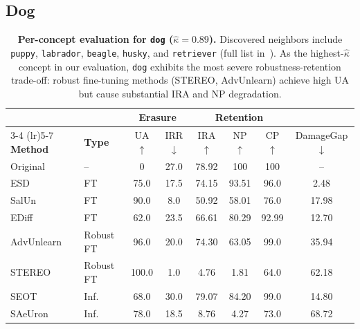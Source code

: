 


\subsection{Dog}
\label{app:per_concept_dog}

\begin{table}[ht]
\centering
\small
\setlength{\tabcolsep}{5pt}
\begin{tabular}{llcccccc}
\toprule
& & \multicolumn{2}{c}{\textbf{Erasure}} & \multicolumn{3}{c}{\textbf{Retention}} & \\
\cmidrule(lr){3-4} \cmidrule(lr){5-7}
\textbf{Method} & \textbf{Type} & UA$\uparrow$ & IRR$\downarrow$ & IRA$\uparrow$ & NP$\uparrow$ & CP$\uparrow$ & DamageGap$\downarrow$ \\
\midrule
Original    & --          & 0     & 27.0  & 78.92 & 100   & 100   & --    \\
\midrule
ESD         & FT          & 75.0  & 17.5  & 74.15 & 93.51 & 96.0  & 2.48  \\
SalUn       & FT          & 90.0  & 8.0   & 50.92 & 58.01 & 76.0  & 17.98 \\
EDiff       & FT          & 62.0  & 23.5  & 66.61 & 80.29 & 92.99 & 12.70 \\
\midrule
AdvUnlearn  & Robust FT   & 96.0  & 20.0  & 74.30 & 63.05 & 99.0  & 35.94 \\
STEREO      & Robust FT   & 100.0 & 1.0   & 4.76  & 1.81  & 64.0  & 62.18 \\
\midrule
SEOT        & Inf.        & 68.0  & 30.0  & 79.07 & 84.20 & 99.0  & 14.80 \\
SAeUron     & Inf.        & 78.0  & 18.5  & 8.76  & 4.27  & 73.0  & 68.72 \\
\bottomrule
\end{tabular}
\caption{\textbf{Per-concept evaluation for \texttt{dog} ($\hat\kappa = 0.89$).} Discovered neighbors include 
\texttt{puppy}, \texttt{labrador}, \texttt{beagle}, \texttt{husky}, and \texttt{retriever} (full list in~). As the highest-$\hat\kappa$ concept in our evaluation, \texttt{dog} exhibits the most severe robustness-retention trade-off: robust fine-tuning methods (STEREO, AdvUnlearn) achieve high UA but cause substantial IRA and NP degradation.}
\label{tab:per_concept_dog}
\end{table}

